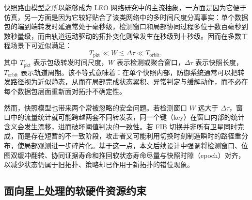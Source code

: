 快照路由模型之所以能够成为 LEO 网络研究中的主流抽象，一方面是因为它便于仿真，另一方面是因为它较好贴合了该类网络中的多时间尺度分离事实：单个数据包的端到端转发时延通常处于毫秒级，检测窗口和局部协同过程多位于数百毫秒到数秒量级，而由轨道运动驱动的拓扑变化则常发生在秒级到十秒级。因而在多数工程场景下可近似满足：
\begin{equation}
    T_{\mathrm{pkt}} \ll W \lesssim \Delta\tau \ll T_{\mathrm{orbit}},
\end{equation}
其中 $T_{\mathrm{pkt}}$ 表示包级转发时间尺度，$W$ 表示检测或聚合窗口，$\Delta\tau$ 表示快照长度，$T_{\mathrm{orbit}}$ 表示轨道周期。该不等式意味着：在单个快照内部，防御系统通常可以把转发路径视为近似静态，从而在局部完成状态累积、异常判定与缓解动作，而不必在每个数据包层面重新面对拓扑不确定性。

然而，快照模型也带来两个常被忽略的安全问题。若检测窗口 $W$ 远大于 $\Delta\tau$，窗口中的流量统计就可能跨越两套不同转发表，同一个键（key）在窗口内部的统计含义会发生漂移，进而破坏阈值判决的一致性。若 FIB 切换并非所有卫星同时完成，而是存在短暂的不一致阶段，攻击者又可能利用切换时刻制造瞬时的路径重分布，使局部观测进一步碎片化。基于这一点，本文后续设计中强调将检测窗口、位图双缓冲翻转、协同证据寿命和推回软状态寿命尽量与快照时隙（epoch）对齐，以减少状态仍属于旧拓扑、策略却已作用于新拓扑的错位现象。


\subsection{面向星上处理的软硬件资源约束}

